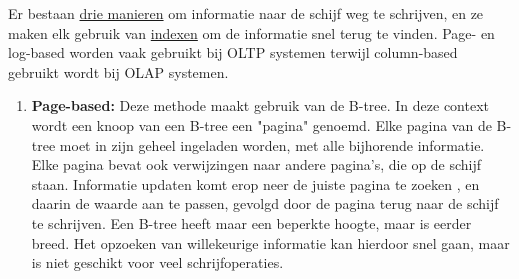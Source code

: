 	Er bestaan \underline{drie manieren} om informatie naar de schijf weg te schrijven, en ze maken elk gebruik van \underline{indexen} om de informatie snel terug te vinden. Page- en log-based worden vaak gebruikt bij OLTP systemen terwijl column-based gebruikt wordt bij OLAP systemen.
	\begin{enumerate}
		\item  \textbf{Page-based:} Deze methode maakt gebruik van de B-tree. In deze context wordt een knoop van een B-tree een "pagina" genoemd. Elke pagina van de B-tree moet in zijn geheel ingeladen worden, met alle bijhorende informatie. Elke pagina bevat ook verwijzingen naar andere pagina's, die op de schijf staan. Informatie updaten komt erop neer de juiste pagina te zoeken , en daarin de waarde aan te passen, gevolgd door de pagina terug naar de schijf te schrijven. Een B-tree heeft maar een beperkte hoogte, maar is eerder breed. Het opzoeken van willekeurige informatie kan hierdoor snel gaan, maar is niet geschikt voor veel schrijfoperaties.


\end{enumerate}
